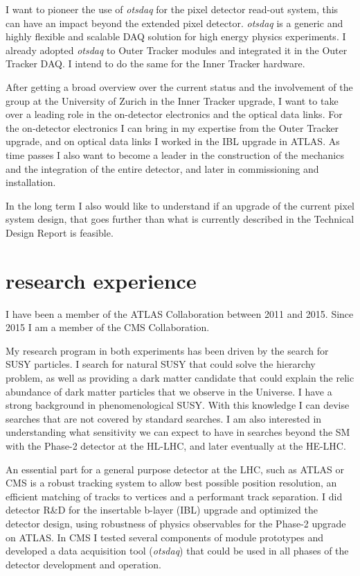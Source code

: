 \documentclass[]{cv} %
\begin{document}
\begin{statement}
I want to pioneer the use of \textit{otsdaq} for the pixel detector read-out
system, this can have an impact beyond the extended pixel detector.
\textit{otsdaq} is a generic and highly flexible and scalable DAQ solution for
high energy physics experiments. I already adopted \textit{otsdaq} to Outer
Tracker modules and integrated it in the Outer Tracker DAQ. I intend to do the
same for the Inner Tracker hardware.

After getting a broad overview over the current status and the involvement of
the group at the University of Zurich in the Inner Tracker upgrade, I want to
take over a leading role in the on-detector electronics and the optical data
links. For the on-detector electronics I can bring in my expertise from the
Outer Tracker upgrade, and on optical data links I worked in the IBL upgrade in
ATLAS. As time passes I also want to become a leader in the construction of the
mechanics and the integration of the entire detector, and later in commissioning
and installation.

In the long term I also would like to understand if an upgrade of the current
pixel system design, that goes further than what is currently described in the
Technical Design Report is feasible.

\newpage
\section{research experience}

I have been a member of the ATLAS Collaboration between 2011 and 2015. Since
2015 I am a member of the CMS Collaboration.

My research program in both experiments has been driven by the search for SUSY
particles. I search for natural SUSY that could solve the hierarchy problem, as
well as providing a dark matter candidate that could explain the relic abundance
of dark matter particles that we observe in the Universe. I have a strong
background in phenomenological SUSY. With this knowledge I can devise searches
that are not covered by standard searches. I am also interested in understanding
what sensitivity we can expect to have in searches beyond the SM with the
Phase-2 detector at the HL-LHC, and later eventually at the HE-LHC.

An essential part for a general purpose detector at the LHC, such as ATLAS or
CMS is a robust tracking system to allow best possible position resolution, an
efficient matching of tracks to vertices and a performant track separation. I
did detector R\&D for the insertable b-layer (IBL) upgrade and optimized the
detector design, using robustness of physics observables for the Phase-2 upgrade
on ATLAS. In CMS I tested several components of module prototypes and developed
a data acquisition tool (\textit{otsdaq}) that could be used in all phases of the
detector development and operation.


\end{statement}
\end{document}
